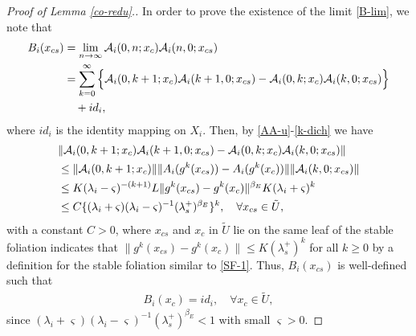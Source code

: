 \documentclass[reqno]{amsart}
\numberwithin{equation}{section}
\begin{document}
\begin{proof}[Proof of Lemma {\rm \ref{co-redu}}.]
In order to prove the existence of the limit \eqref{B-lim}, we
note that
\begin{align}\label{BB-conju}
B_i(x_{cs})&=\lim_{n\to \infty} \mathcal{A}_i(0,n;x_c)
\mathcal{A}_i(n,0;x_{cs})
\notag \\
&=\sum_{k=0}^\infty \Big\{ \mathcal{A}_i(0,k+1;x_c)\mathcal{A}_i(k+1,0;x_{cs})-
\mathcal{A}_i(0,k;x_c)\mathcal{A}_i(k,0;x_{cs}) \Big\}
\notag \\
&\quad+id_i,
\end{align}
where $id_i$ is the identity mapping on $X_i$.
Then, by \eqref{AA-u}-\eqref{k-dich} we have
\begin{align}\label{Ga-1}
&\|\mathcal{A}_i(0,k+1;x_c)
\mathcal{A}_i(k+1,0;x_{cs})-
\mathcal{A}_i(0,k;x_c)\mathcal{A}_i(k,0;x_{cs})\|
\notag \\
& \le \|\mathcal{A}_i(0,k+1;x_c) \| \| A_i(g^k(x_{cs}))-A_i(g^k(x_c)) \|
\| \mathcal{A}_i(k,0;x_{cs})\|
\notag \\
& \le K (\lambda_i - \varsigma)^{-(k+1)} L \|g^k(x_{cs})-g^k(x_c)\|^{\beta_E} K(\lambda_i+\varsigma)^k
\notag \\
& \le C \{(\lambda_i+\varsigma)(\lambda_i-\varsigma)^{-1}(\lambda_s^+ )^{\beta_E}\}^k,\quad \forall x_{cs}\in \tilde U,
\end{align}
with a constant $C>0$, where $x_{cs}$ and $x_c$ in $\tilde U$ lie on the same leaf of the stable foliation indicates that $\|g^k(x_{cs})-g^k(x_c)\| \le K (\lambda_s^+)^k$ for all $k\ge 0$ by a definition for the stable foliation similar to \eqref{SF-1}.
Thus, $B_i(x_{cs})$ is well-defined such that
\begin{align}\label{BB-idid}
B_i(x_{c})=id_i,\quad \forall x_c\in \tilde U,
\end{align}
since
$(\lambda_i+\varsigma)(\lambda_i-\varsigma)^{-1} (\lambda_s^+)^{\beta_E}<1$ with small $\varsigma>0$.


\end{proof}
\end{document}
